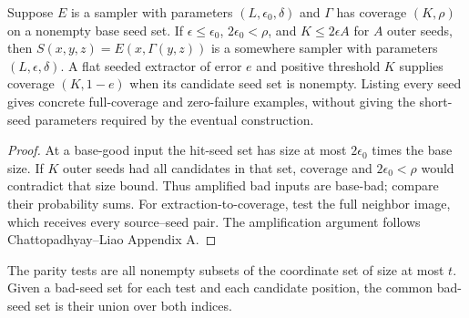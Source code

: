 \begin{theorem}
  \label{thm:lowerbounds-algebraic-sampler-amplification}
  \leanok
  Suppose $E$ is a sampler with parameters $(L,\epsilon_0,\delta)$
  and $\Gamma$ has coverage $(K,\rho)$ on a nonempty base seed set.
  If $\epsilon\le\epsilon_0$, $2\epsilon_0<\rho$, and
  $K\le2\epsilon A$ for $A$ outer seeds, then
  $S(x,y,z)=E(x,\Gamma(y,z))$ is a somewhere sampler with parameters
  $(L,\epsilon,\delta)$. A flat seeded extractor of error $e$ and
  positive threshold $K$ supplies coverage $(K,1-e)$ when its candidate
  seed set is nonempty. Listing every seed gives concrete full-coverage
  and zero-failure examples, without giving the short-seed parameters
  required by the eventual construction.
\end{theorem}
\begin{proof}
  \leanok
  At a base-good input the hit-seed set has size at most
  $2\epsilon_0$ times the base size. If $K$ outer seeds had all
  candidates in that set, coverage and $2\epsilon_0<\rho$ would
  contradict that size bound. Thus amplified bad inputs are base-bad;
  compare their probability sums. For extraction-to-coverage, test the
  full neighbor image, which receives every source--seed pair.
  The amplification argument follows Chattopadhyay--Liao Appendix A.
\end{proof}

\begin{definition}
  \label{def:lowerbounds-algebraic-parity-bad-seeds}
  \leanok
  The parity tests are all nonempty subsets of the coordinate set of
  size at most $t$. Given a bad-seed set for each test and each candidate
  position, the common bad-seed set is their union over both indices.
\end{definition}

